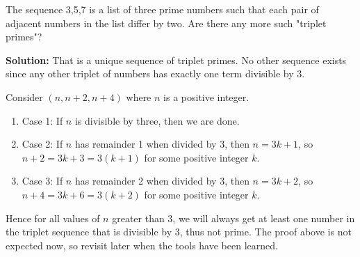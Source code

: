 The sequence 3,5,7 is a list of three prime numbers such that each pair of adjacent numbers in the list differ by two. Are there any more such "triplet primes"?

\doublespacing

\textbf{Solution:} That is a unique sequence of triplet primes. No other sequence exists since any other triplet of numbers has exactly one term divisible by 3.

\doublespacing

Consider $(n,n+2,n+4)$ where $n$ is a positive integer.
\begin{enumerate}
    \item[] Case 1: If $n$ is divisible by three, then we are done.
    \item[] Case 2: If $n$ has remainder 1 when divided by 3, then $n=3k+1$, so $n+2=3k+3=3(k+1)$ for some positive integer $k$.
    \item[] Case 3: If $n$ has remainder 2 when divided by 3, then $n=3k+2$, so $n+4=3k+6=3(k+2)$ for some positive integer $k$.
\end{enumerate}

Hence for all values of $n$ greater than 3, we will always get at least one number in the triplet sequence that is divisible by 3, thus not prime. The proof above is not expected now, so revisit later when the tools have been learned.